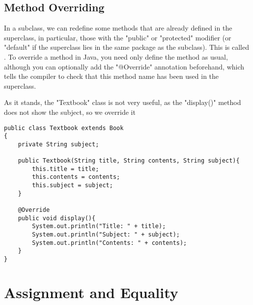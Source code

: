 \documentclass[11pt]{report}
\begin{document}
\subsection{Method Overriding}
In a subclass, we can redefine some methods that are already defined in the superclass, in particular, those with the \inlineJava"public" or \inlineJava"protected" modifier (or \inlineJava"default" if the superclass lies in the same package as the subclass). This is called . To override a method in Java, you need only define the method as usual, although you can optionally add the \inlineJava"@Override" annotation beforehand, which tells the compiler to check that this method name has been used in the superclass.
\begin{eg}
    As it stands,  the \inlineJava"Textbook" class is not very useful, as the \inlineJava"display()" method does not show the subject, so we override it
\begin{lstlisting}[caption = Textbook, label=lst:Textbook2]
public class Textbook extends Book
{
    private String subject;

    public Textbook(String title, String contents, String subject){
        this.title = title;
        this.contents = contents;
        this.subject = subject;
    }

    @Override
    public void display(){
        System.out.println("Title: " + title);
        System.out.println("Subject: " + subject);
        System.out.println("Contents: " + contents);
    }
}
\end{lstlisting}
\end{eg}

\pagebreak
\section{Assignment and Equality}
\end{document}
